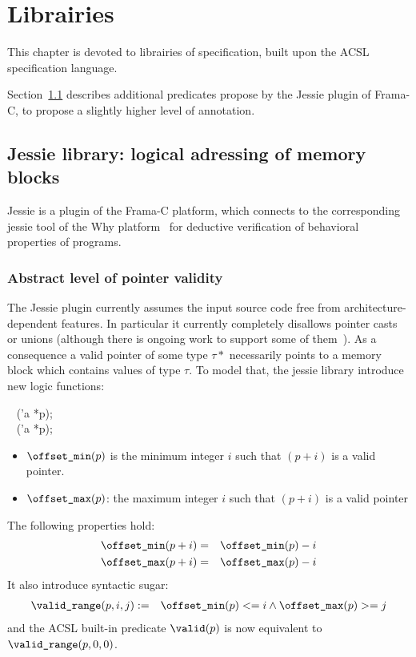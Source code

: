 \chapter{Librairies}
\label{chap:lib}

This chapter is devoted to librairies of specification, built upon the ACSL specification language.

Section~\ref{sec:jessie} describes additional predicates propose by the Jessie plugin of Frama-C, to propose a slightly higher level of annotation.


\section{Jessie library: logical adressing of memory blocks}
\label{sec:jessie}

Jessie is a plugin of the Frama-C platform, which connects to the
corresponding jessie tool of the Why platform~\cite{filliatre07cav}
for deductive verification of behavioral properties of programs.

\subsection{Abstract level of pointer validity}

The Jessie plugin currently assumes the input source code free from
architecture-dependent features. In particular it currently completely
disallows pointer casts or unions (although there is ongoing work to
support some of them~\cite{moy07ccpp}). As a consequence a valid
pointer of some type $\tau*$ necessarily points to a memory block
which contains values of type $\tau$. To model that, the jessie library introduce new logic functions:
\begin{flushleft}
\integer ~ \offsetmin('a *p); \\
\integer ~ \offsetmax('a *p);
\end{flushleft}

\begin{itemize}
\item $\texttt{{\textbackslash}offset\_min}(p)$ is the minimum integer $i$ such that $(p+i)$ is a
  valid pointer.

\item $\texttt{{\textbackslash}offset\_max}(p)$: the maximum integer $i$ such that $(p+i)$ is a
  valid pointer
\end{itemize}
The following properties hold:
\begin{eqnarray*}
\texttt{{\textbackslash}offset\_min}(p+i) &=& \texttt{{\textbackslash}offset\_min}(p)-i \\
\texttt{{\textbackslash}offset\_max}(p+i) &=& \texttt{{\textbackslash}offset\_max}(p)-i
\end{eqnarray*}
It also introduce syntactic sugar:
\begin{eqnarray*}
\texttt{{\textbackslash}valid\_range}(p,i,j) &:=& \texttt{{\textbackslash}offset\_min}(p) <= i \land \texttt{{\textbackslash}offset\_max}(p) >= j 
\end{eqnarray*}
and the ACSL built-in predicate $\texttt{{\textbackslash}valid}(p)$ is now equivalent to
$\texttt{{\textbackslash}valid\_range}(p,0,0)$.

